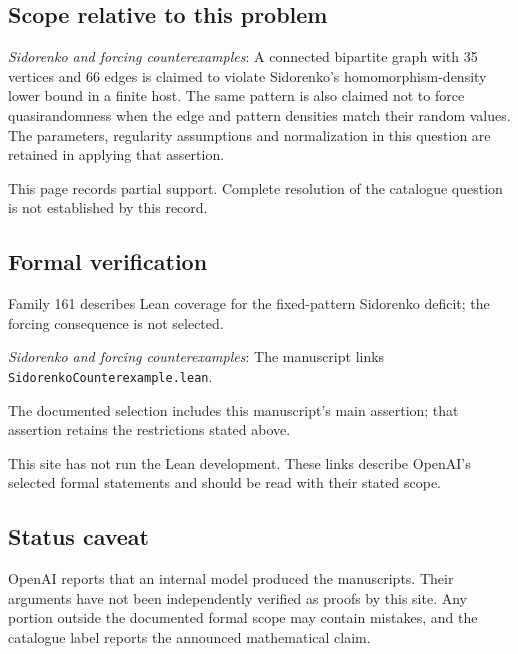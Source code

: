 \documentclass[11pt]{article}
\begin{document}
\subsection{Scope relative to this problem}
\textit{Sidorenko and forcing counterexamples}: A connected bipartite graph with 35 vertices and 66 edges is claimed to violate Sidorenko’s homomorphism-density lower bound in a finite host. The same pattern is also claimed not to force quasirandomness when the edge and pattern densities match their random values. The parameters, regularity assumptions and normalization in this question are retained in applying that assertion.

This page records partial support. Complete resolution of the catalogue question is not established by this record.

\subsection{Formal verification}
Family 161 describes Lean coverage for the fixed-pattern Sidorenko deficit; the forcing consequence is not selected.

\textit{Sidorenko and forcing counterexamples}: The manuscript links \texttt{SidorenkoCounterexample.lean}.

The documented selection includes this manuscript’s main assertion; that assertion retains the restrictions stated above.

This site has not run the Lean development. These links describe OpenAI’s selected formal statements and should be read with their stated scope.

\subsection{Status caveat}
OpenAI reports that an internal model produced the manuscripts. Their arguments have not been independently verified as proofs by this site. Any portion outside the documented formal scope may contain mistakes, and the catalogue label reports the announced mathematical claim.
\end{document}
